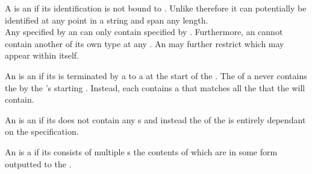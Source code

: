 A  is an  if its identification is not bound to . Unlike  therefore it can potentially be identified at any point in a string and span any length. \\

Any  specified by an  can only contain  specified by . Furthermore, an  cannot contain another  of its own type at any . An  may further restrict which  may appear within itself.

An  is an  if its  is terminated by a  to a  at the start of the . The  of a  never contains the   by the 's starting . Instead, each   contains a  that matches all the  that the  will contain.

An  is an  if its  does not contain any s and instead the  of the  is entirely dependant on the  specification.

An  is a  if its  consists of multiple s the contents of which are in some form outputted to the .







